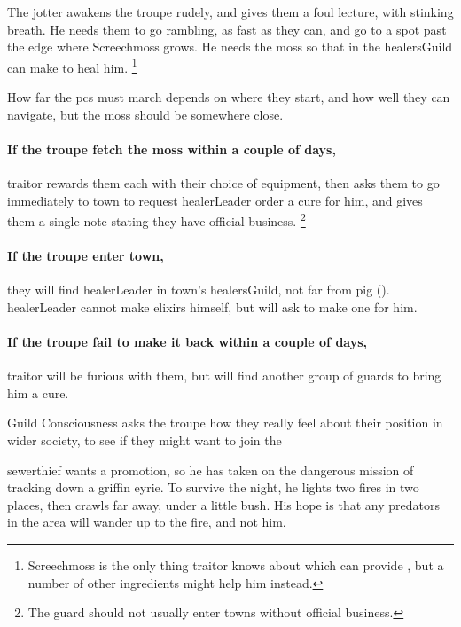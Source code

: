\noindent
The \gls{jotter} awakens the troupe rudely, and gives them a foul lecture, with stinking breath.
He needs them to go \gls{rambling}, as fast as they can, and go to a spot past the \gls{edge} where Screechmoss%
grows.
He needs the moss so that  in the \gls{healersGuild} can make  to heal him.%
\footnote{Screechmoss is the only thing \gls{traitor} knows about which can provide , but a number of other \glspl{ingredient} might help him instead.}

How far the \glspl{pc} must march depends on where they start, and how well they can navigate,%
but the moss should be somewhere close.

\paragraph{If the troupe fetch the moss within a couple of days,}
\gls{traitor} rewards them each with their choice of equipment, then asks them to go immediately to \gls{town} to request \gls{healerLeader} order a cure for him, and gives them a single note stating they have official business.%
\footnote{The \gls{guard} should not usually enter towns without official business.}

\paragraph{If the troupe enter \gls{town},}
they will find \gls{healerLeader} in \gls{town}'s \gls{healersGuild}, not far from \gls{pig} ().
\gls{healerLeader} cannot make \glspl{elixir} himself, but will ask  to make one for him.

\paragraph{If the troupe fail to make it back within a couple of days,}
\gls{traitor} will be furious with them, but will find another group of \glspl{guard} to bring him a cure.

{Guild Consciousness}%
{ asks the troupe how they really feel about their position in wider society, to see if they might want to join the }%

\Gls{sewerthief} wants a promotion, so he has taken on the dangerous mission of tracking down a griffin eyrie.
To survive the night, he lights two fires in two places, then crawls far away, under a little bush.
His hope is that any predators in the area will wander up to the fire, and not him.

